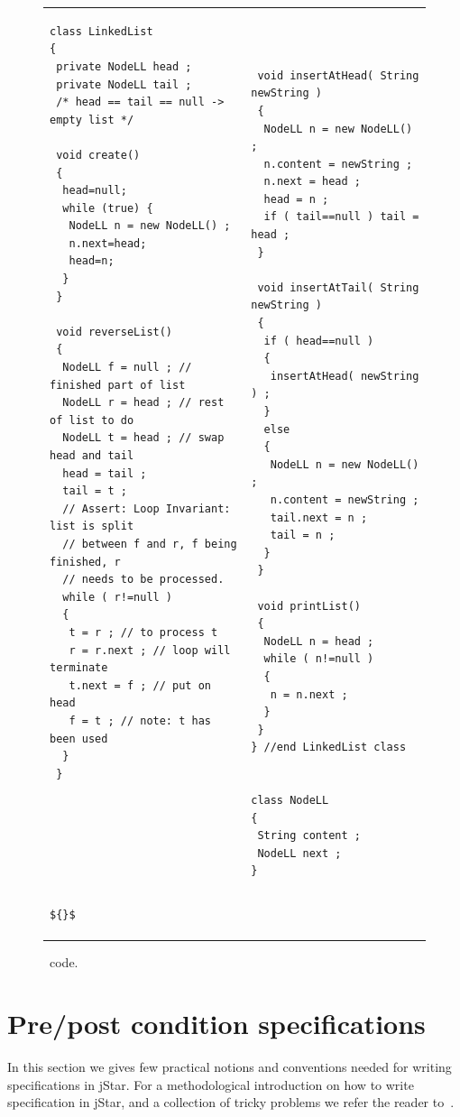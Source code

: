 \documentclass[11pt]{article}
\newcommand{\jStar}{{\sf jStar}}
\begin{document}
%
\begin{figure}[phtb]
  \centering
  \begin{tabular}{l@{\quad\;}|@{\quad}l}
    \begin{lstlisting}
class LinkedList
{
 private NodeLL head ;
 private NodeLL tail ;
 /* head == tail == null -> empty list */

 void create()
 {
  head=null;
  while (true) {
   NodeLL n = new NodeLL() ;
   n.next=head;
   head=n;
  }
 }
 
 void reverseList()
 {
  NodeLL f = null ; // finished part of list
  NodeLL r = head ; // rest of list to do
  NodeLL t = head ; // swap head and tail
  head = tail ;
  tail = t ;
  // Assert: Loop Invariant: list is split
  // between f and r, f being finished, r
  // needs to be processed.
  while ( r!=null )
  {
   t = r ; // to process t
   r = r.next ; // loop will terminate 
   t.next = f ; // put on head
   f = t ; // note: t has been used
  }
 }







${}$
\end{lstlisting}
&
\begin{lstlisting}   
 void insertAtHead( String newString )
 {
  NodeLL n = new NodeLL() ;
  n.content = newString ;
  n.next = head ;
  head = n ;
  if ( tail==null ) tail = head ;
 }

 void insertAtTail( String newString )
 {
  if ( head==null )
  {
   insertAtHead( newString ) ;
  }
  else
  {
   NodeLL n = new NodeLL() ;
   n.content = newString ;
   tail.next = n ;
   tail = n ;
  }
 }
 
 void printList()
 {
  NodeLL n = head ;
  while ( n!=null )
  {
   n = n.next ;
  }
 } 
} //end LinkedList class


class NodeLL
{
 String content ;
 NodeLL next ;
}
\end{lstlisting}
  \end{tabular}
  \caption{\linkedlist \ code.}
  \label{tab:linkedlist}
\end{figure}


\section{Pre/post condition specifications}
\label{sec:pre/post}
In this section we gives few practical notions and conventions needed
for writing specifications in \jStar. For a methodological introduction
on how to write specification in \jStar, and a collection of tricky
problems we refer the reader to~\cite{jstar}.
\end{document}
